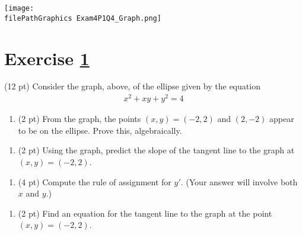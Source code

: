 \spaceSolution{3.5in}{%
}%





%
%
%
%


\newpage

\begin{center}
\texttt{[image: \\filePathGraphics Exam4P1Q4\_Graph.png]}
\end{center}
\section{Exercise \ref{sec : Math112 Spring2022 FinalExam P1Q4}}
\label{sec : Math112 Spring2022 FinalExam P1Q4}

(12 pt) Consider the graph, above, of the ellipse given by the equation
\begin{align*}
x^{2} + x y + y^{2}
=
4
\end{align*}

\begin{enumerate}[label=(\alph*)]
\item\label{itm : P1Q4a} (2 pt) From the graph, the points $(x,y) = (-2,2)$ and $(2,-2)$ appear to be on the ellipse. Prove this, algebraically.
\end{enumerate}

\spaceSolution{2.5in}{%
}%



\begin{enumerate}[resume,label=(\alph*)]
\item\label{itm : P1Q4b} (2 pt) Using the graph, predict the slope of the tangent line to the graph at $(x,y) = (-2,2)$.
\end{enumerate}

\spaceSolution{2.5in}{%
}%



\begin{enumerate}[resume,label=(\alph*)]
\item\label{itm : P1Q4c} (4 pt) Compute the rule of assignment for $y'$. (Your answer will involve both $x$ and $y$.)
\end{enumerate}

\spaceSolution{2.5in}{%
}%



\begin{enumerate}[resume,label=(\alph*)]
\item\label{itm : P1Q4d} (2 pt) Find an equation for the tangent line to the graph at the point $(x,y) = (-2,2)$.
\end{enumerate}

